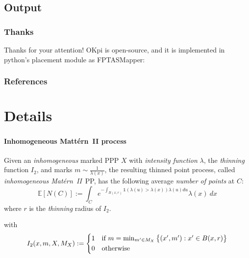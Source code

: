 \documentclass[aspectratio=169]{beamer}
\begin{document}
\subsection{Output}




\begin{frame}
    \frametitle{Thanks}

    {\centering \huge
        Thanks for your attention!
    }
    \vfill
    OKpi is open-source, and it is implemented in python's placement module as FPTASMapper:
\end{frame}






\begin{frame}[allowframebreaks]
        \frametitle{References}
        \printbibliography[heading=none]
\end{frame}







\section*{Details}
\begin{frame}
    \frametitle{\secname}
    \framesubtitle{Inhomogeneous Mattérn~II process}
    \begin{lemma}
    Given an \emph{inhomogeneous} marked PPP $X$ with \emph{intensity function} $\lambda$, the \emph{thinning} function $I_2$, and marks $m \sim \frac{1}{\lambda(x)}$, the resulting thinned point process, called \emph{inhomogeneous Mat\'ern~II}~PP, has the following average \emph{number of points} at $C$:
        \begin{equation}
            \mathbb{E}\left[ N(C) \right] := \int_C e^{-\int_{B(x,r)} \mathds{1}\left(\lambda(u) > \lambda(x) \right) \lambda(u) du} \lambda(x)\ dx
            \label{eq:inh-matern2-avg}
        \end{equation}
        where $r$ is the \emph{thinning} radius of $I_2$.
        \label{prop:inh-matern2-avg}
    \end{lemma}



    \vfill
    with
    \begin{equation}
        I_2(x,m, X, M_X) := \begin{cases*}
            1 & if $m = \min_{m' \in M_X}\big\{ (x',m'): x'\in B(x,r) \big\}$\\
            0 & otherwise
        \end{cases*}
        \label{eq:matern2}
    \end{equation}

\end{frame}
\end{document}

